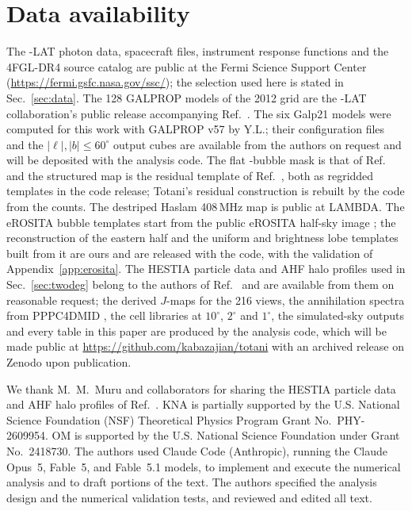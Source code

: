 
\section*{Data availability}

The \fermi-LAT photon data, spacecraft files, instrument response functions
and the 4FGL-DR4 source catalog are public at the Fermi Science Support
Center (\url{https://fermi.gsfc.nasa.gov/ssc/}); the selection used here is
stated in Sec.~\ref{sec:data}. The 128 GALPROP models of the 2012 grid are
the \fermi-LAT collaboration's public release accompanying
Ref.~\cite{Ackermann:2012pya}. The six Galp21 models were computed for this
work with GALPROP v57 by Y.L.; their configuration files and the
$|\ell|,|b|\le60^\circ$ output cubes are available from the authors on
request and will be deposited with the analysis code. The flat \fermi-bubble
mask is that of Ref.~\cite{Fermi-LAT:2014sfa} and the structured map is the
residual template of Ref.~\cite{Fermi-LAT:2017opo}, both as regridded
templates in the code release; Totani's residual construction is rebuilt by
the code from the counts. The destriped Haslam 408\,MHz map
\cite{Remazeilles:2014mba} is public at LAMBDA. The eROSITA bubble
templates start from the public eROSITA half-sky image
\cite{Predehl:2020kyq}; the reconstruction of the eastern half and the
uniform and brightness lobe templates built from it are ours and are
released with the code, with the validation of Appendix~\ref{app:erosita}.
The HESTIA particle data and AHF halo profiles used in
Sec.~\ref{sec:twodeg} belong to the authors of Ref.~\cite{Muru:2025vpz} and
are available from them on reasonable request; the derived $J$-maps for
the 216 views, the annihilation spectra from PPPC4DMID
\cite{Cirelli:2010xx}, the cell libraries at $10^\circ$, $2^\circ$ and
$1^\circ$, the simulated-sky outputs and every table in this paper are
produced by the analysis code, which will be made public at
\url{https://github.com/kabazajian/totani} with an archived release on
Zenodo upon publication.

\begin{acknowledgments}
We thank M.~M.~Muru and collaborators for sharing the HESTIA particle data
and AHF halo profiles of Ref.~\cite{Muru:2025vpz}.
KNA is partially supported by the U.S. National Science Foundation (NSF) Theoretical Physics Program Grant No.\ PHY-2609954.
OM is supported by the U.S. National Science Foundation under Grant No.\ 2418730.
The authors used Claude Code (Anthropic), running the Claude Opus~5, Fable~5, and Fable~5.1 models, to implement and execute the numerical analysis and to draft portions of the text.
The authors specified the analysis design and the numerical validation tests, and reviewed and edited all text.
\end{acknowledgments}
